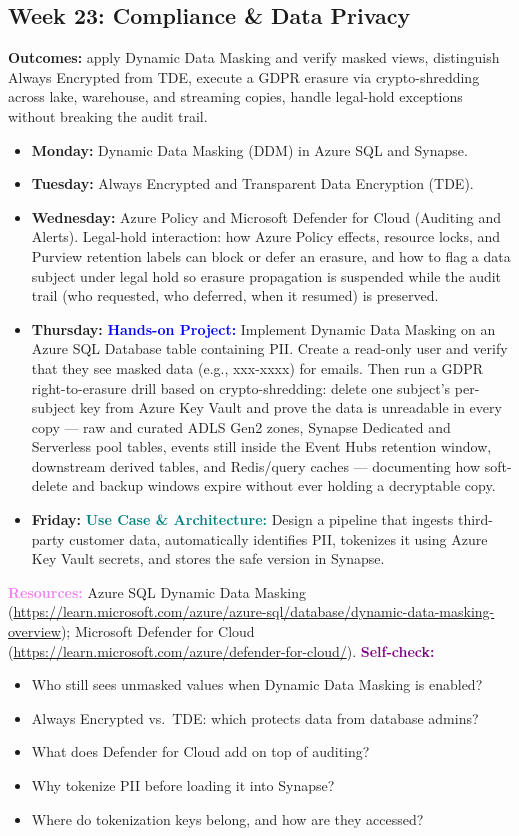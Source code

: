 \documentclass[11pt, a4paper]{article}
\newcommand{\project}[1]{\vspace{1mm}\noindent\textbf{\textcolor{blue}{Hands-on Project:}} #1}
\newcommand{\usecase}[1]{\vspace{1mm}\noindent\textbf{\textcolor{teal}{Use Case \& Architecture:}} #1}
\newcommand{\dayitem}[2]{\item \textbf{#1:} #2}
\newcommand{\resources}[1]{\vspace{1mm}\noindent\textbf{\textcolor{violet}{Resources:}} #1}
\newcommand{\selfcheck}[1]{\vspace{1mm}\noindent\textbf{\textcolor{purple}{Self-check:}} #1}
\begin{document}
\subsection*{Week 23: Compliance \& Data Privacy}
\par\noindent\textbf{Outcomes:} apply Dynamic Data Masking and verify masked views, distinguish Always Encrypted from TDE, execute a GDPR erasure via crypto-shredding across lake, warehouse, and streaming copies, handle legal-hold exceptions without breaking the audit trail.
\begin{itemize}[label=-]
    \dayitem{Monday}{Dynamic Data Masking (DDM) in Azure SQL and Synapse.}
    \dayitem{Tuesday}{Always Encrypted and Transparent Data Encryption (TDE).}
    \dayitem{Wednesday}{Azure Policy and Microsoft Defender for Cloud (Auditing and Alerts). Legal-hold interaction: how Azure Policy effects, resource locks, and Purview retention labels can block or defer an erasure, and how to flag a data subject under legal hold so erasure propagation is suspended while the audit trail (who requested, who deferred, when it resumed) is preserved.}
    \dayitem{Thursday}{\project{Implement Dynamic Data Masking on an Azure SQL Database table containing PII. Create a read-only user and verify that they see masked data (e.g., xxx-xxxx) for emails. Then run a GDPR right-to-erasure drill based on crypto-shredding: delete one subject's per-subject key from Azure Key Vault and prove the data is unreadable in every copy --- raw and curated ADLS Gen2 zones, Synapse Dedicated and Serverless pool tables, events still inside the Event Hubs retention window, downstream derived tables, and Redis/query caches --- documenting how soft-delete and backup windows expire without ever holding a decryptable copy.}}
    \dayitem{Friday}{\usecase{Design a pipeline that ingests third-party customer data, automatically identifies PII, tokenizes it using Azure Key Vault secrets, and stores the safe version in Synapse.}}
\end{itemize}
\resources{Azure SQL Dynamic Data Masking (\url{https://learn.microsoft.com/azure/azure-sql/database/dynamic-data-masking-overview}); Microsoft Defender for Cloud (\url{https://learn.microsoft.com/azure/defender-for-cloud/}).}
\selfcheck{\begin{itemize}[label=-, itemsep=0pt]
    \item Who still sees unmasked values when Dynamic Data Masking is enabled?
    \item Always Encrypted vs.\ TDE: which protects data from database admins?
    \item What does Defender for Cloud add on top of auditing?
    \item Why tokenize PII before loading it into Synapse?
    \item Where do tokenization keys belong, and how are they accessed?
\end{itemize}}
\end{document}
